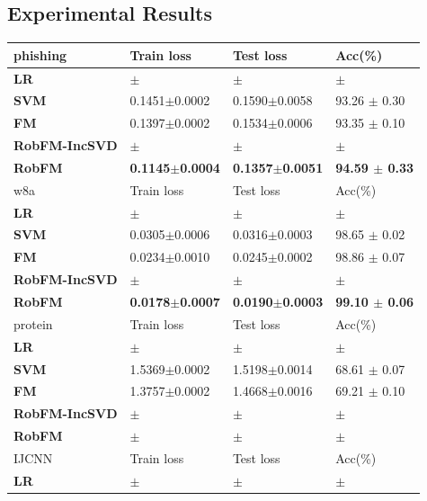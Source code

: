 \documentclass[letterpaper]{article} %
\begin{document}
\subsection{Experimental Results}
\begin{table}
	\begin{tabu} to \textwidth {|X[c]| X[c]| X[c]| X[c]|}
		\hline
		phishing           & Train loss & Test loss & Acc(\%)  \\
		\hline
		\textbf{LR} 	 &$\pm$  &$\pm$  &  $\pm$    \\ \hline
		\textbf{SVM} 	 &0.1451$\pm$0.0002  &0.1590$\pm$0.0058  &  93.26 $\pm$ 0.30    \\ \hline
		\textbf{FM} 	  	&0.1397$\pm$0.0002 &0.1534$\pm$0.0006  &93.35 $\pm$ 0.10   \\ \hline
		\textbf{RobFM-IncSVD} 	 &$\pm$  &$\pm$  &  $\pm$    \\ \hline
		\textbf{RobFM}   	&\textbf{0.1145$\pm$0.0004} &\textbf{0.1357$\pm$0.0051}  &\textbf{94.59 $\pm$ 0.33}   \\ \hline
		w8a               & Train loss & Test loss & Acc(\%) \\
		\hline
		\textbf{LR} 	 &$\pm$  &$\pm$  &  $\pm$    \\ \hline
		\textbf{SVM} 	 &0.0305$\pm$0.0006  &0.0316$\pm$0.0003  & 98.65 $\pm$ 0.02   \\ \hline
		\textbf{FM} 	 &0.0234$\pm$0.0010  &0.0245$\pm$0.0002  & 98.86 $\pm$ 0.07   \\ \hline
		\textbf{RobFM-IncSVD} 	 &$\pm$  &$\pm$  &  $\pm$    \\ \hline
		\textbf{RobFM}   &\textbf{0.0178$\pm$0.0007}  &\textbf{0.0190$\pm$0.0003}  &\textbf{99.10 $\pm$ 0.06}  \\ \hline
		\hline
		protein               & Train loss & Test loss & Acc(\%) \\
		\hline
		\textbf{LR} 	 &$\pm$  &$\pm$  &  $\pm$    \\ \hline
		\textbf{SVM} 	 &1.5369$\pm$0.0002  &1.5198$\pm$0.0014  & 68.61 $\pm$ 0.07    \\ \hline
		\textbf{FM} 	 &1.3757$\pm$0.0002  &1.4668$\pm$0.0016  &69.21 $\pm$ 0.10    \\ \hline
		\textbf{RobFM-IncSVD} 	 &$\pm$  &$\pm$  &  $\pm$    \\ \hline
		\textbf{RobFM}   &\textbf{$\pm$}  &\textbf{$\pm$}  &\textbf{$\pm$}  \\ \hline
		\hline
		IJCNN              & Train loss & Test loss & Acc(\%) \\
		\hline
		\textbf{LR} 	 &$\pm$  &$\pm$  &  $\pm$    \\ \hline

\end{tabu}
\end{table}
\end{document}
